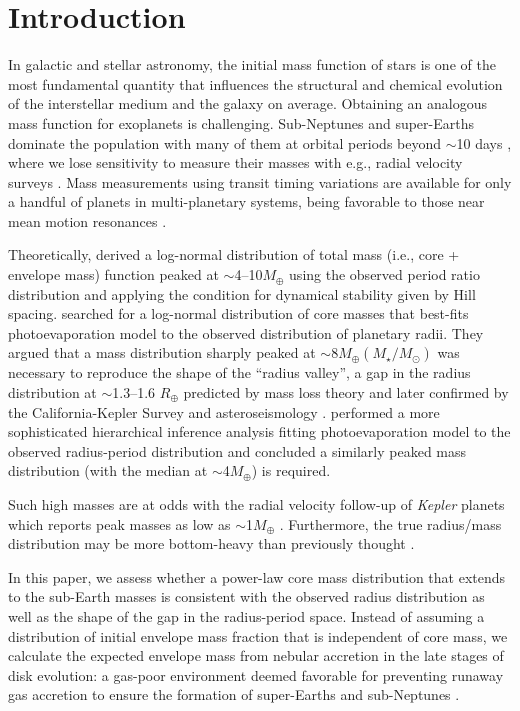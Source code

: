 \documentclass[twocolumn]{aastex63}
\begin{document}
\section{Introduction} 
\label{sec:intro}

In galactic and stellar astronomy, the initial mass function of stars is one of the most fundamental quantity that influences the structural and chemical evolution of the interstellar medium and the galaxy on average. Obtaining an analogous mass function for exoplanets is challenging. Sub-Neptunes and super-Earths dominate the population with many of them at orbital periods beyond $\sim$10 days \citep[e.g.,][]{Fressin13,Petigura13,Burke15}, where we lose sensitivity to measure their masses with e.g., radial velocity surveys \citep[e.g.,][]{Weiss14}. Mass measurements using transit timing variations are available for only a handful of planets in multi-planetary systems, being favorable to those near mean motion resonances \citep[e.g.,][]{Wu-ttv13,Hadden14}.

Theoretically, \citet{Malhotra15} derived a log-normal distribution of total mass (i.e., core + envelope mass) function peaked at $\sim$4--10$M_\oplus$ using the observed period ratio distribution and applying the condition for dynamical stability given by Hill spacing. \citet{Wu19} searched for a log-normal distribution of core masses that best-fits photoevaporation model to the observed distribution of planetary radii. They argued that a mass distribution sharply peaked at $\sim$8$M_\oplus(M_\star/M_\odot)$ was necessary to reproduce the shape of the ``radius valley'', a gap in the radius distribution at $\sim$1.3--1.6 $R_\oplus$ predicted by mass loss theory \citep{Owen13} and later confirmed by the California-Kepler Survey \citep{Fulton17,Fulton18} and asteroseismology \citep{vanEylen18}. \citet{Rogers20} performed a more sophisticated hierarchical inference analysis fitting photoevaporation model to the observed radius-period distribution and concluded a similarly peaked mass distribution (with the median at $\sim$4$M_\oplus$) is required. 

Such high masses are at odds with the radial velocity follow-up of {\it Kepler} planets which reports peak masses as low as $\sim$1$M_\oplus$ \citep{Weiss14}. Furthermore, the true radius/mass distribution may be more bottom-heavy than previously thought \citep{Hsu19}.

In this paper, we assess whether a power-law core mass distribution that extends to the sub-Earth masses is consistent with the observed radius distribution as well as the shape of the gap in the radius-period space. Instead of assuming a distribution of initial envelope mass fraction that is independent of core mass, we calculate the expected envelope mass from nebular accretion in the late stages of disk evolution: a gas-poor environment deemed favorable for preventing runaway gas accretion to ensure the formation of super-Earths and sub-Neptunes \citep{Lee14,Lee16}. 
\end{document}
